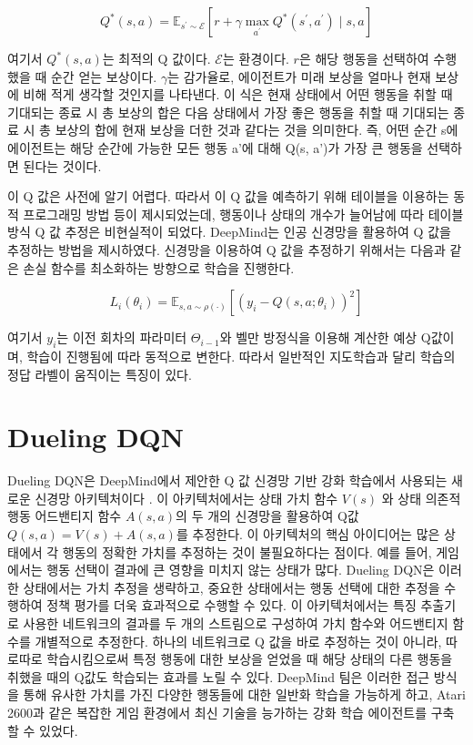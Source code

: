 \documentclass[oneside, under, ko]{snuthesis}
\begin{document}
\[
Q^*(s, a) = \mathbb{E}_{s^{\prime} \sim \mathcal{E}}\left[r+\gamma \max _{a^{\prime}} Q^*\left(s^{\prime}, a^{\prime}\right) \mid s, a\right]
\]

여기서 $Q^*(s, a)$는 최적의 Q 값이다. $\mathcal{E}$는 환경이다. $r$은 해당 행동을 선택하여 수행했을 때 순간 얻는 보상이다. $\gamma$는 감가율로, 에이전트가 미래 보상을 얼마나 현재 보상에 비해 적게 생각할 것인지를 나타낸다. 이 식은 현재 상태에서 어떤 행동을 취할 때 기대되는 종료 시 총 보상의 합은 다음 상태에서 가장 좋은 행동을 취할 때 기대되는 종료 시 총 보상의 합에 현재 보상을 더한 것과 같다는 것을 의미한다. 즉, 어떤 순간 s에 에이전트는 해당 순간에 가능한 모든 행동 a'에 대해 Q(s, a')가 가장 큰 행동을 선택하면 된다는 것이다.

이 Q 값은 사전에 알기 어렵다. 따라서 이 Q 값을 예측하기 위해 테이블을 이용하는 동적 프로그래밍 방법 등이 제시되었는데, 행동이나 상태의 개수가 늘어남에 따라 테이블 방식 Q 값 추정은 비현실적이 되었다. DeepMind는 인공 신경망을 활용하여 Q 값을 추정하는 방법을 제시하였다\cite{DQN}.  신경망을 이용하여 Q 값을 추정하기 위해서는 다음과 같은 손실 함수를 최소화하는 방향으로 학습을 진행한다.

\[
    L_i\left(\theta_i\right)=\mathbb{E}_{s, a \sim \rho(\cdot)}\left[\left(y_i-Q\left(s, a ; \theta_i\right)\right)^2\right]
\]

여기서 $y_i$는 이전 회차의 파라미터 $\Theta_{i-1}$와 벨만 방정식을 이용해 계산한 예상 Q값이며, 학습이 진행됨에 따라 동적으로 변한다. 따라서 일반적인 지도학습과 달리 학습의 정답 라벨이 움직이는 특징이 있다. 

\section{Dueling DQN}
Dueling DQN은 DeepMind에서 제안한 Q 값 신경망 기반 강화 학습에서 사용되는 새로운 신경망 아키텍처이다 \cite{DuelingDQN}  . 이 아키텍처에서는 상태 가치 함수 $V(s)$ 와 상태 의존적 행동 어드밴티지 함수 $A(s, a)$의 두 개의 신경망을 활용하여 Q값 $Q(s,a) = V(s) + A(s, a)$를 추정한다. 이 아키텍처의 핵심 아이디어는 많은 상태에서 각 행동의 정확한 가치를 추정하는 것이 불필요하다는 점이다. 예를 들어, 게임에서는 행동 선택이 결과에 큰 영향을 미치지 않는 상태가 많다. Dueling DQN은 이러한 상태에서는 가치 추정을 생략하고, 중요한 상태에서는 행동 선택에 대한 추정을 수행하여 정책 평가를 더욱 효과적으로 수행할 수 있다. 이 아키텍처에서는 특징 추출기로 사용한 네트워크의 결과를 두 개의 스트림으로 구성하여 가치 함수와 어드밴티지 함수를 개별적으로 추정한다. 하나의 네트워크로 Q 값을 바로 추정하는 것이 아니라, 따로따로 학습시킴으로써 특정 행동에 대한 보상을 얻었을 때 해당 상태의 다른 행동을 취했을 때의 Q값도 학습되는 효과를 노릴 수 있다. DeepMind 팀은 이러한 접근 방식을 통해 유사한 가치를 가진 다양한 행동들에 대한 일반화 학습을 가능하게 하고, Atari 2600과 같은 복잡한 게임 환경에서 최신 기술을 능가하는 강화 학습 에이전트를 구축할 수 있었다. 
\end{document}
